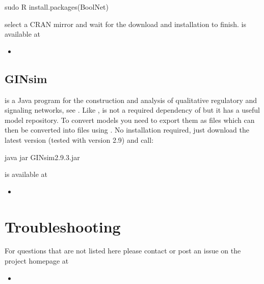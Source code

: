 \documentclass[letterpaper,10pt,english]{sphinxmanual}
\begin{document}
\begin{sphinxVerbatim}[commandchars=\\\{\}]
\PYGZdl{} sudo R
\PYGZgt{} install.packages(\PYGZdq{}BoolNet\PYGZdq{})
\end{sphinxVerbatim}

select a CRAN mirror and wait for the download and installation to finish.
 is available at
\begin{itemize}
\item {} 

\end{itemize}


\subsection{GINsim}
\label{\detokenize{Installation:installation-ginsim}}\label{\detokenize{Installation:ginsim}}
 is a Java program for the construction and analysis of qualitative regulatory and signaling networks, see {\hyperref[\detokenize{Bibliography:chaouiya2012}]{}}.
Like ,  is not a required dependency of  but it has a useful model repository. To convert  models you need to export them as  files which can then be converted into  files using .
No installation required, just download the latest version (tested with version 2.9) and call:

\begin{sphinxVerbatim}[commandchars=\\\{\}]
\PYGZdl{} java \PYGZhy{}jar GINsim\PYGZhy{}2.9.3.jar
\end{sphinxVerbatim}

 is available at
\begin{itemize}
\item {} 

\end{itemize}


\section{Troubleshooting}
\label{\detokenize{Installation:installation-troubleshooting}}\label{\detokenize{Installation:troubleshooting}}
For questions that are not listed here please contact  or post an issue on the project homepage at
\begin{itemize}
\item {} 

\end{itemize}
\end{document}
